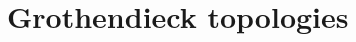 \documentclass[../Main]{subfiles}
\begin{document}
\section{Grothendieck topologies}
\end{document}
